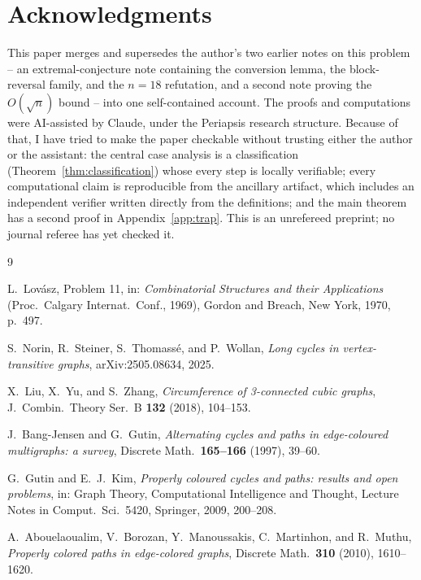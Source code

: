 \documentclass[11pt]{article}
\theoremstyle{definition}
\begin{document}
\section*{Acknowledgments}

This paper merges and supersedes the author's two earlier notes on this problem -- an
extremal-conjecture note containing the conversion lemma, the block-reversal family, and
the $n=18$ refutation, and a second note proving the $O(\sqrt n)$ bound -- into one
self-contained account. The proofs and computations were AI-assisted by Claude, under
the Periapsis research structure. Because of that, I have tried to make the paper
checkable without trusting either the author or the assistant: the central case analysis
is a classification (Theorem~\ref{thm:classification}) whose every step is locally
verifiable; every computational claim is reproducible from the ancillary artifact, which
includes an independent verifier written directly from the definitions; and the main
theorem has a second proof in Appendix~\ref{app:trap}. This is an unrefereed preprint;
no journal referee has yet checked it.

\begin{thebibliography}{9}

L.~Lov\'asz,
Problem 11, in:
\emph{Combinatorial Structures and their Applications}
(Proc.\ Calgary Internat.\ Conf., 1969),
Gordon and Breach, New York, 1970, p.~497.

S.~Norin, R.~Steiner, S.~Thomass\'e, and P.~Wollan,
\emph{Long cycles in vertex-transitive graphs},
arXiv:2505.08634, 2025.

X.~Liu, X.~Yu, and S.~Zhang,
\emph{Circumference of 3-connected cubic graphs},
J.~Combin.\ Theory Ser.~B \textbf{132} (2018), 104--153.

J.~Bang-Jensen and G.~Gutin,
\emph{Alternating cycles and paths in edge-coloured multigraphs: a survey},
Discrete Math.\ \textbf{165--166} (1997), 39--60.

G.~Gutin and E.~J.~Kim,
\emph{Properly coloured cycles and paths: results and open problems},
in: Graph Theory, Computational Intelligence and Thought,
Lecture Notes in Comput.\ Sci.\ 5420, Springer, 2009, 200--208.

A.~Abouelaoualim, V.~Borozan, Y.~Manoussakis, C.~Martinhon, and R.~Muthu,
\emph{Properly colored paths in edge-colored graphs},
Discrete Math.\ \textbf{310} (2010), 1610--1620.

\end{thebibliography}
\end{document}
